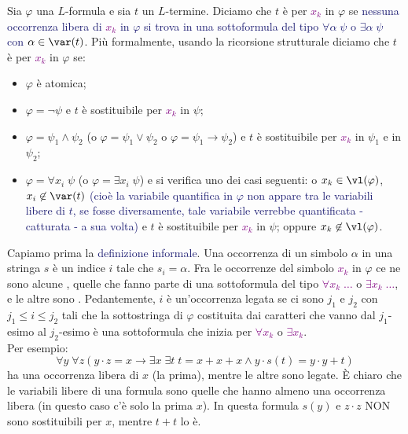 \begin{definition}[Sostituibilità]
    Sia $\varphi$ una $L$-formula e sia $t$ un $L$-termine. Diciamo che $t$ è  per \textcolor{purple}{$x_k$} in $\varphi$ se \textcolor{MidnightBlue}{nessuna occorrenza libera di \textcolor{purple}{$x_k$} in $\varphi$ si trova in una sottoformula del tipo $\forall \alpha \; \psi$ o $\exists \alpha \; \psi$ con $\alpha \in \var(t)$}.
    Più formalmente, usando la ricorsione strutturale diciamo che $t$ è  per \textcolor{purple}{$x_k$} in $\varphi$ se:
    \begin{itemize}
        \item $\varphi$ è atomica;
        \item $\varphi = \neg \psi$ e $t$ è sostituibile per \textcolor{purple}{$x_k$} in $\psi$;
        \item $\varphi = \psi_1 \land \psi_2$ (o $\varphi = \psi_1 \lor \psi_2$ o $\varphi = \psi_1 \to \psi_2$) e $t$ è sostituibile per \textcolor{purple}{$x_k$} in $\psi_1$ e in $\psi_2$;
        \item $\varphi = \forall x_i \; \psi$ (o $\varphi = \exists x_i \; \psi$) e si verifica uno dei casi seguenti: o $x_k \in \vl(\varphi)$, $x_i \not \in \var(t)$ \textcolor{MidnightBlue}{(cioè la variabile quantifica in $\varphi$ non appare tra le variabili libere di $t$, se fosse diversamente, tale variabile verrebbe quantificata - catturata - a sua volta)} e $t$ è sostituibile per \textcolor{purple}{$x_k$} in $\psi$; oppure $x_k \not \in \vl(\varphi)$.
    \end{itemize}
\end{definition}

Capiamo prima la \textcolor{MidnightBlue}{definizione informale}. Una occorrenza di un simbolo $\alpha$ in una stringa $s$ è un indice $i$ tale che $s_i = \alpha$. Fra le occorrenze del simbolo \textcolor{purple}{$x_k$} in $\varphi$ ce ne sono alcune 
, quelle che fanno parte di una sottoformula del tipo \textcolor{purple}{$\forall x_k \; \ldots$} o \textcolor{purple}{$\exists x_k \; \ldots$}, e le altre sono . Pedantemente, $i$ è un'occorrenza legata se ci sono $j_1$ e $j_2$ con $j_1 \leq i \leq j_2$ tali che 
la sottostringa di $\varphi$ costituita dai caratteri che vanno dal $j_1$-esimo al $j_2$-esimo è una sottoformula che inizia per \textcolor{purple}{$\forall x_k$} o \textcolor{purple}{$\exists x_k$}.\\
Per esempio:
\[ \forall y \; \forall z (y\cdot z = x \to \exists x \; \exists t \; t = x + x + x \land y\cdot s(t) = y \cdot y + t)
\]
ha una occorrenza libera di $x$ (la prima), mentre le altre sono legate. È chiaro che le variabili libere di una formula sono quelle che hanno almeno una occorrenza libera (in questo caso c'è solo la prima $x$).
In questa formula $s(y)$ e $z \cdot z$ NON sono sostituibili per $x$, mentre $t + t$ lo è.

